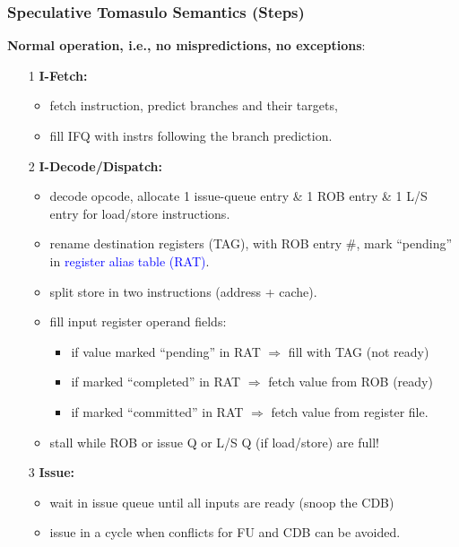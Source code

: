 \documentclass{beamer}
\newcommand{\blue}[1]{\textcolor{Blue}{{#1}}}
\newcommand{\emp}[1]{\textcolor{DikuRed}{ #1}}
\begin{document}
\begin{frame}[fragile,t]
\frametitle{Speculative Tomasulo Semantics (Steps)}

\emp{\bf Normal operation, i.e., no mispredictions, no exceptions}:
\begin{itemize}
\item[1] \emp{\bf I-Fetch:}\smallskip
\begin{itemize}
    \item fetch instruction, predict branches and their targets,
    \item fill IFQ with instrs following the branch prediction.
\end{itemize}\medskip

\item[2] \emp{\bf I-Decode/Dispatch:}
\begin{itemize}
    \item decode opcode, allocate 1 issue-queue entry \& 1 ROB entry \& 1 L/S entry for load/store instructions. 
    \item rename destination registers (TAG), with ROB entry \#, mark ``pending'' in \blue{register alias table (RAT)}.
    \item split store in two instructions (address + cache).
    \item fill input register operand fields:
    \begin{itemize}
        \item if value marked ``pending'' in RAT $\Rightarrow$ fill with TAG (not ready)
        \item if marked ``completed'' in RAT $\Rightarrow$ fetch value from ROB (ready)
        \item if marked ``committed'' in RAT $\Rightarrow$ fetch value from register file.  
    \end{itemize}
    \item stall while ROB or issue Q or L/S Q (if load/store) are full!
\end{itemize}\medskip

\item[3] \emp{\bf Issue:}
\begin{itemize}
    \item wait in issue queue until all inputs are ready (snoop the CDB)
    \item issue in a cycle when conflicts for FU and CDB can be avoided.
\end{itemize}\medskip
\end{itemize}

\end{frame}
\end{document}
